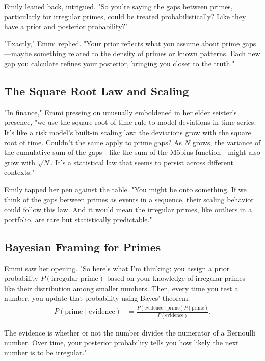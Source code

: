 Emily leaned back, intrigued. "So you’re saying the gaps between primes, particularly for irregular primes, could be treated probabilistically? Like they have a prior and posterior probability?"

"Exactly," Emmi replied. "Your prior reflects what you assume about prime gaps—maybe something related to the density of primes or known patterns. Each new gap you calculate refines your posterior, bringing you closer to the truth."

\subsection*{The Square Root Law and Scaling}


"In finance," Emmi pressing on unusually emboldened in her elder seister's presence, "we use the square root of time rule to model deviations in time series. It’s like a risk model’s built-in scaling law: the deviations grow with the square root of time. Couldn’t the same apply to prime gaps? As \(N\) grows, the variance of the cumulative sum of the gaps—like the sum of the Möbius function—might also grow with \(\sqrt{N}\). It’s a statistical law that seems to persist across different contexts."

Emily tapped her pen against the table. "You might be onto something. If we think of the gaps between primes as events in a sequence, their scaling behavior could follow this law. And it would mean the irregular primes, like outliers in a portfolio, are rare but statistically predictable."

\subsection*{Bayesian Framing for Primes}

Emmi saw her opening. "So here’s what I’m thinking: you assign a prior probability \(P(\text{irregular prime})\) based on your knowledge of irregular primes—like their distribution among smaller numbers. Then, every time you test a number, you update that probability using Bayes’ theorem:
\begin{align*}  
P(\text{prime} \mid \text{evidence}) 
&= \frac{P(\text{evidence} \mid \text{prime}) P(\text{prime})}
      {P(\text{evidence})}.
\end{align*}

The evidence is whether or not the number divides the numerator of a Bernoulli number. Over time, your posterior probability tells you how likely the next number is to be irregular."

